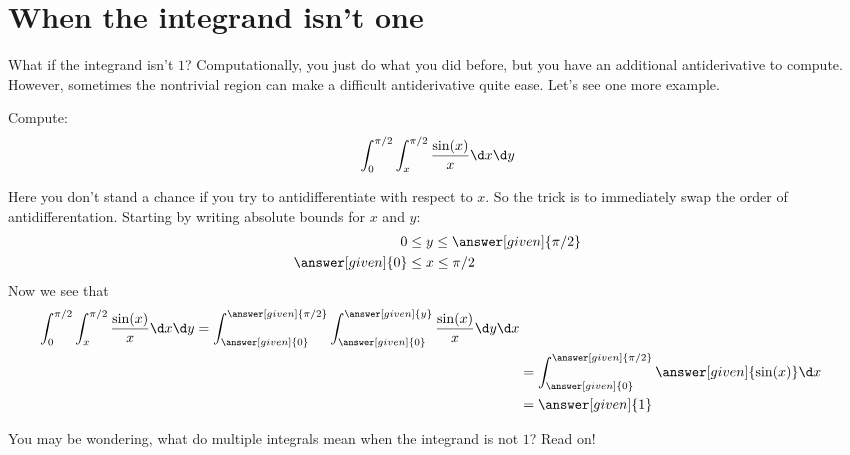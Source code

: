 \documentclass{ximera}
\begin{document}
\section{When the integrand isn't one}

What if the integrand isn't $1$? Computationally, you just do what you
did before, but you have an additional antiderivative to
compute. However, sometimes the nontrivial region can make a difficult antiderivative quite ease. Let's see one more example.

\begin{example}
  Compute:
  \[
  \int_0^{\pi/2}\int_x^{\pi/2} \frac{\sin(x)}{x} \d x \d y
  \]
  \begin{explanation}
    Here you don't stand a chance if you try to antidifferentiate with
    respect to $x$. So the trick is to immediately swap the order of
    antidifferentation. Starting by writing absolute bounds for $x$
    and $y$:
    \begin{align*}
    0 &\le y \le \answer[given]{\pi/2}\\
    \answer[given]{0} &\le x \le \pi/2
    \end{align*}
    Now we see that
    \begin{align*}
      \int_0^{\pi/2}\int_x^{\pi/2} \frac{\sin(x)}{x} \d x \d y = \int_{\answer[given]{0}}^{\answer[given]{\pi/2}}\int_{\answer[given]{0}}^{\answer[given]{y}} \frac{\sin(x)}{x} \d y \d x\\
      &= \int_{\answer[given]{0}}^{\answer[given]{\pi/2}} \answer[given]{\sin(x)} \d x\\
        &=\answer[given]{1}
    \end{align*}
  \end{explanation}
\end{example}


You may be wondering, what do multiple integrals mean when the
integrand is not $1$? Read on! 
\end{document}
